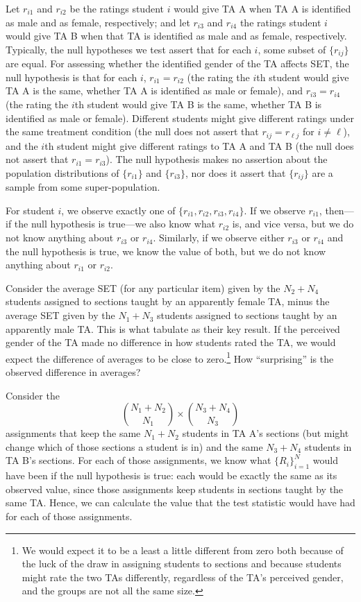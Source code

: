 \documentclass[12pt]{article}
\newcommand{\beq}{\begin{equation}}
\newcommand{\eeq}{\end{equation}}
\begin{document}
Let $r_{i1}$ and $r_{i2}$ be the ratings student $i$ would give TA A when TA 
A is identified as male and as female, respectively; and let 
$r_{i3}$ and $r_{i4}$ the ratings student $i$ would give TA B when that TA
is identified as male and as female, respectively.
Typically, the null hypotheses we test assert that for each $i$, some subset of
$\{r_{ij}\}$ are  equal.
For assessing whether the identified gender of the TA affects SET,
the null hypothesis is that for each $i$,
$r_{i1} = r_{i2}$ (the rating the $i$th student would give TA A is the same,
whether TA A is identified as male or female), 
and $r_{i3} = r_{i4}$ (the rating the $i$th student would give TA B is
the same, whether TA B is identified as male or female).
Different students might give different ratings under the same treatment condition
(the null does not assert that $r_{ij} = r_{\ell j}$ for $i \ne \ell$), and
the $i$th student might 
give different ratings to TA A and TA B
(the null does not assert that $r_{i1} = r_{i3}$).
The null hypothesis makes no assertion about the population distributions of 
$\{r_{i1}\}$ and $\{r_{i3}\}$, nor does it assert that $\{r_{ij}\}$ are 
a sample from some super-population.

For student $i$, we observe exactly one of $\{r_{i1}, r_{i2}, r_{i3}, r_{i4}\}$.
If we observe $r_{i1}$, then---if the null hypothesis is true---we also know what $r_{i2}$ is,
and vice versa, but we do not know anything about $r_{i3}$ or $r_{i4}$.
Similarly, if we observe either $r_{i3}$ or $r_{i4}$ and the null hypothesis is true,
we know the value of both, but we do not know anything about $r_{i1}$ or $r_{i2}$.

Consider the average SET (for any particular item)
given by the $N_2 + N_4$ students
assigned to sections taught by an apparently female TA, minus the 
average SET given by the $N_1 + N_3$ students
assigned to sections taught by an apparently male TA.
This is what \cite{MacNell2014} tabulate as their key result.
If the perceived gender of the TA made no difference in how students rated 
the TA, we would expect the difference of averages to be close to
zero.\footnote{%
We would expect it to be a least a little different from zero both because of the luck of the draw
in assigning students to sections and because students might rate the two TAs
differently, regardless of the TA's perceived gender, and the groups are not all the same size.
}
How ``surprising'' is the observed difference in averages?

Consider the
\beq
{{N_1 + N_2} \choose {N_1}} \times {{N_3+N_4} \choose {N_3}}
\eeq
assignments that keep the same $N_1 + N_2$ students in TA A's
sections (but might change which of those sections a student is in) 
and the same $N_3 + N_4$ students in TA B's sections.
For each of those assignments, we know what $\{R_i\}_{i=1}^N$ would
have been if the null hypothesis is true: each would be exactly the same
as its observed value, since those
assignments keep students in sections taught by the same TA.
Hence, we can calculate the value that the test statistic would have had for each
of those assignments.
\end{document}
